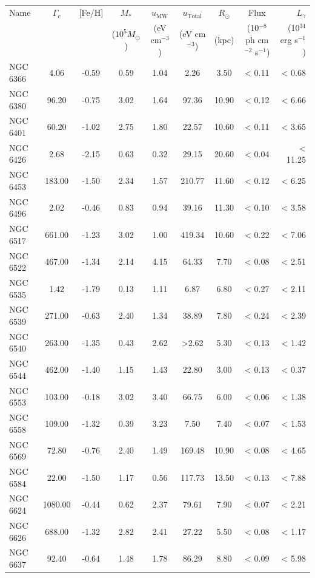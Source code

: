 \documentclass[doublespace,draft,nopageskip]{VTthesis} %
\begin{document}
\begin{appendices}
\begin{table}
\centering
\begin{tabular}{lcccccccr}
\hline
Name &  $\Gamma_c$& [Fe/H]  & $M_*$ & $u_\text{MW}$ & $u_\text{Total}$ & $R_\odot$ & Flux & $L_\gamma$ \\
 & &  & ($10^5 M_\odot$) & (eV cm$^{-3}$) & (eV cm$^{-3}$) & (kpc) & (10$^{-8}$ ph cm$^{-2}$ s$^{-1}$)  & (10$^{34}$ erg s$^{-1}$)\\
\hline
NGC 6366 & 4.06 & -0.59 & 0.59 & 1.04 & 2.26 & 3.50 & < 0.11 & < 0.68\\
NGC 6380 & 96.20 & -0.75 & 3.02 & 1.64 & 97.36 & 10.90 & < 0.12 & < 6.66\\
NGC 6401 & 60.20 & -1.02 & 2.75 & 1.80 & 22.57 & 10.60 & < 0.11 & < 3.65\\
NGC 6426 & 2.68 & -2.15 & 0.63 & 0.32 & 29.15 & 20.60 & < 0.04 & < 11.25\\
NGC 6453 & 183.00 & -1.50 & 2.34 & 1.57 & 210.77 & 11.60 & < 0.12 & < 6.25\\
NGC 6496 & 2.02 & -0.46 & 0.83 & 0.94 & 39.16 & 11.30 & < 0.10 & < 3.58\\
NGC 6517 & 661.00 & -1.23 & 3.02 & 1.00 & 419.34 & 10.60 & < 0.22 & < 7.06\\
NGC 6522 & 467.00 & -1.34 & 2.14 & 4.15 & 64.33 & 7.70 & < 0.08 & < 2.51\\
NGC 6535 & 1.42 & -1.79 & 0.13 & 1.11 & 6.87 & 6.80 & < 0.27 & < 2.11\\
NGC 6539 & 271.00 & -0.63 & 2.40 & 1.34 & 38.89 & 7.80 & < 0.24 & < 2.39\\
NGC 6540 & 263.00 & -1.35 & 0.43 & 2.62 & >2.62 & 5.30 & < 0.13 & < 1.42\\
NGC 6544 & 462.00 & -1.40 & 1.15 & 1.43 & 22.80 & 3.00 & < 0.13 & < 0.37\\
NGC 6553 & 103.00 & -0.18 & 3.02 & 3.40 & 66.75 & 6.00 & < 0.06 & < 1.38\\
NGC 6558 & 109.00 & -1.32 & 0.39 & 3.23 & 7.50 & 7.40 & < 0.07 & < 1.53\\
NGC 6569 & 72.80 & -0.76 & 2.40 & 1.49 & 169.48 & 10.90 & < 0.08 & < 4.65\\
NGC 6584 & 22.00 & -1.50 & 1.17 & 0.56 & 117.73 & 13.50 & < 0.13 & < 7.88\\
NGC 6624 & 1080.00 & -0.44 & 0.62 & 2.37 & 79.61 & 7.90 & < 0.07 & < 2.21\\
NGC 6626 & 688.00 & -1.32 & 2.82 & 2.41 & 27.22 & 5.50 & < 0.08 & < 1.17\\
NGC 6637 & 92.40 & -0.64 & 1.48 & 1.78 & 86.29 & 8.80 & < 0.09 & < 5.98\\

\end{tabular}
\end{table}
\end{appendices}
\end{document}
